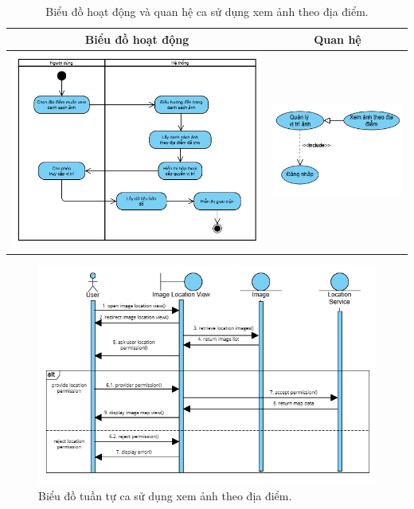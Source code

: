 \noindent 
\begin{table}[H]
\centering
\begin{tabular}{| c | c |}
    \hline
    \textbf{Biểu đồ hoạt động} & \textbf{Quan hệ} \\ 
    \hline
    \includegraphics[width=0.6\linewidth]{figures/c3/3-3-14-activity-diagram.png} 
    &  
    \includegraphics[width=0.35\linewidth]{figures/c3/3-3-14-relationship.png} \\ 
    \hline
\end{tabular}
\caption{Biểu đồ hoạt động và quan hệ ca sử dụng xem ảnh theo địa điểm.}
\label{tab:view-image-location-usecase-activity}
\end{table}

\begin{figure}[H]
    \centering  
    \includegraphics[width=1.1\textwidth]{figures/c3/3-3-14-sequence-diagram.png}
    \caption{Biểu đồ tuần tự ca sử dụng xem ảnh theo địa điểm.}
    \label{fig:3-3-14-sequence-diagram}
\end{figure}